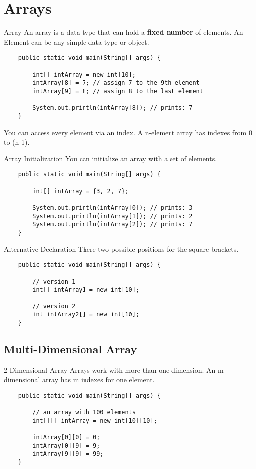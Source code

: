 \section{Arrays}
\begin{frame}[fragile]{Array}
	An array is a data-type that can hold a \textbf{fixed number} of elements. 
	An Element can be any simple data-type or object.
	\begin{lstlisting}
	public static void main(String[] args) {
	
	    int[] intArray = new int[10];
	    intArray[8] = 7; // assign 7 to the 9th element
	    intArray[9] = 8; // assign 8 to the last element
	    
	    System.out.println(intArray[8]); // prints: 7
	}
	\end{lstlisting}
	You can access every element via an index. A n-element array has indexes from 0 to (n-1).
\end{frame}

\begin{frame}[fragile]{Array Initialization} %
	You can initialize an array with a set of elements.
	\begin{lstlisting}
	public static void main(String[] args) {
	
	    int[] intArray = {3, 2, 7};
	    
	    System.out.println(intArray[0]); // prints: 3
	    System.out.println(intArray[1]); // prints: 2
	    System.out.println(intArray[2]); // prints: 7
	}
	\end{lstlisting}
\end{frame}

\begin{frame}[fragile]{Alternative Declaration}
	There two possible positions for the square brackets. 
	\begin{lstlisting}
	public static void main(String[] args) {

	    // version 1	
	    int[] intArray1 = new int[10];
	    
	    // version 2
	    int intArray2[] = new int[10];
	}
	\end{lstlisting}
\end{frame}

\subsection{Multi-Dimensional Array}
\begin{frame}[fragile]{2-Dimensional Array}
	Arrays work with more than one dimension. 
	An m-dimensional array has m indexes for one element.
	\begin{lstlisting}
	public static void main(String[] args) {

	    // an array with 100 elements
	    int[][] intArray = new int[10][10];
	    
	    intArray[0][0] = 0;
	    intArray[0][9] = 9;
	    intArray[9][9] = 99;
	}
	\end{lstlisting}
\end{frame}

